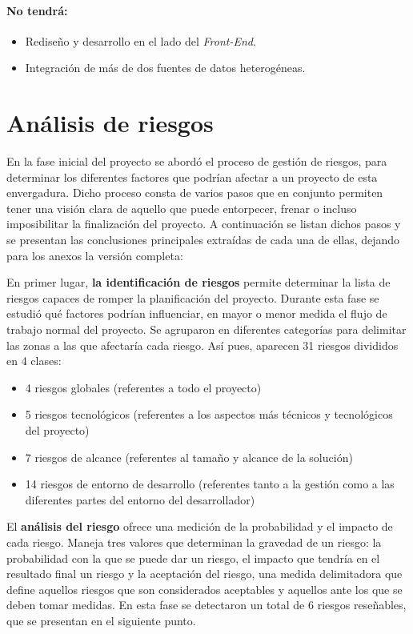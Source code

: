 \paragraph*{No tendrá:} 
\begin{itemize}
\item Rediseño y desarrollo en el lado del \textit{Front-End}.
\item Integración de más de dos fuentes de datos heterogéneas. 
\end{itemize}




\section{Análisis de riesgos}  \label{analisis.riesgos}
En la fase inicial del proyecto se abordó el proceso de gestión de riesgos, para determinar los diferentes factores que podrían afectar a un proyecto de esta envergadura. Dicho proceso consta de varios pasos que en conjunto permiten tener una visión clara de aquello que puede entorpecer, frenar o incluso imposibilitar la finalización del proyecto. A continuación se listan dichos pasos y se presentan las conclusiones principales extraídas de cada una de ellas, dejando para los anexos la versión completa: 
\par En primer lugar, \textbf{la identificación de riesgos} permite determinar la lista de riesgos capaces de romper la planificación del proyecto. Durante esta fase se estudió qué factores podrían influenciar, en mayor o menor medida el flujo de trabajo normal del proyecto. Se agruparon en diferentes categorías para delimitar las zonas a las que afectaría cada riesgo. Así pues, aparecen 31 riesgos divididos en 4 clases:
\begin{itemize}
\item 4 riesgos globales (referentes a todo el proyecto)
\item 5 riesgos tecnológicos (referentes a los aspectos más técnicos y tecnológicos del proyecto)
\item 7 riesgos de alcance (referentes al tamaño y alcance de la solución)
\item 14 riesgos de entorno de desarrollo (referentes tanto a la gestión como a las diferentes partes del entorno del desarrollador)
\end{itemize}
\par El \textbf{análisis del riesgo} ofrece una medición de la probabilidad y el impacto de cada riesgo. Maneja tres valores que determinan la gravedad de un riesgo: la probabilidad con la que se puede dar un riesgo, el impacto que tendría en el resultado final un riesgo y la aceptación del riesgo, una medida delimitadora que define aquellos riesgos que son considerados aceptables y aquellos ante los que se deben tomar medidas. En esta fase se detectaron un total de 6 riesgos reseñables, que se presentan en el siguiente punto.
